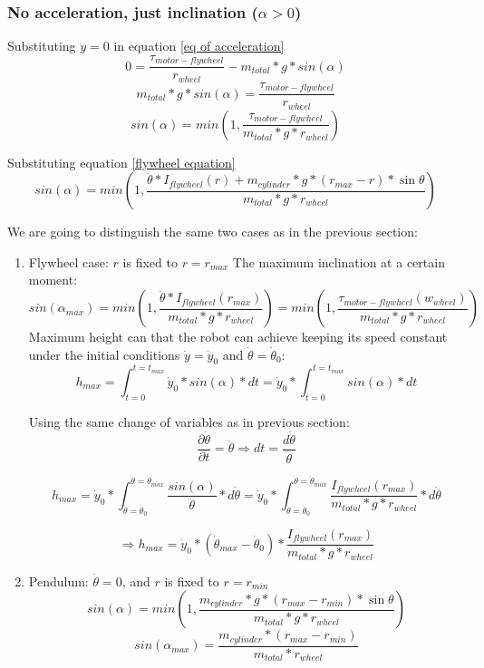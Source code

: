 \subsubsection{No acceleration, just inclination ($\alpha > 0$)}
Substituting $\ddot{y}=0$ in equation \ref{eq of acceleration}
\[0 = \frac{\tau_{motor-flywheel}}{r_{wheel}} - m_{total} * g * sin(\alpha)\]
\[m_{total} * g * sin(\alpha) = \frac{\tau_{motor-flywheel}}{r_{wheel}} \]
\[sin(\alpha) = min(1,\frac{\tau_{motor-flywheel}}{m_{total} * g * r_{wheel}}) \]

Substituting equation \ref{flywheel equation}
\[sin(\alpha) = min(1,\frac{\ddot{\theta}*I_{flywheel}(r) + m_{cylinder} * g * (r_{max} - r) * \sin{\theta}}{m_{total} * g * r_{wheel}}) \]


We are going to distinguish the same two cases as in the previous section:
\begin{enumerate}
    \item Flywheel case: $r$ is fixed to $r = r_{max}$
    The maximum inclination at a certain moment:
    \begin{equation}\label{Maximum angle using flywheel system}
        sin(\alpha_{max}) = min(1,\frac{\ddot{\theta}*I_{flywheel}(r_{max})}{m_{total} * g * r_{wheel}}) = min(1,\frac{\tau_{motor-flywheel}(w_{wheel})}{m_{total} * g * r_{wheel}})
    \end{equation}
    Maximum height can that the robot can achieve keeping its speed constant under the initial conditions $\dot{y}=\dot{y}_0$ and $\dot{\theta}=\dot{\theta}_0$:
    \[h_{max}=\int_{t=0}^{t=t_{max}} \dot{y}_0*sin(\alpha) * dt  = \dot{y}_0* \int_{t=0}^{t=t_{max}} sin(\alpha) * dt\]

    Using the same change of variables as in previous section:    
    \[
    \frac{\partial \dot{\theta}}{\partial t} = \ddot{\theta} \Rightarrow dt = \frac{d\dot{\theta}}{\ddot{\theta}}
    \]

    \[h_{max}= \dot{y}_0* \int_{\dot{\theta}=\dot{\theta}_0}^{\dot{\theta}=\dot{\theta}_{max}} \frac{sin(\alpha)}{\ddot{\theta}} * d\dot{\theta} = \dot{y}_0* \int_{\dot{\theta}=\dot{\theta}_0}^{\dot{\theta}=\dot{\theta}_{max}} \frac{I_{flywheel}(r_{max})}{m_{total} * g * r_{wheel}} * d\dot{\theta}\]


    \[\boxed{\Rightarrow h_{max}= \dot{y}_0* (\dot{\theta}_{max}- \dot{\theta}_0) * \frac{I_{flywheel}(r_{max})}{m_{total} * g * r_{wheel}}}\]

    \item Pendulum: $\dot{\theta} = 0$, and $r$ is fixed to $r = r_{min}$
    \[sin(\alpha) = min(1,\frac{m_{cylinder} * g * (r_{max} - r_{min}) * \sin{\theta}}{m_{total} * g * r_{wheel}}) \]
    \begin{equation}\label{Maximum angle using pendulum system}
        sin(\alpha_{max}) = \frac{m_{cylinder} * (r_{max}- r_{min})}{m_{total} * r_{wheel}}
    \end{equation}
\end{enumerate}


